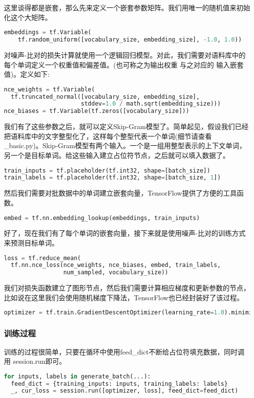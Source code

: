 这里谈得都是嵌套，那么先来定义一个嵌套参数矩阵。我们用唯一的随机值来初始化这个大矩阵。
\begin{lstlisting}[language=Python]
embeddings = tf.Variable(
    tf.random_uniform([vocabulary_size, embedding_size], -1.0, 1.0))
\end{lstlisting}
对噪声-比对的损失计算就使用一个逻辑回归模型。对此，我们需要对语料库中的每个单词定义一个权重值和偏差值。(也可称之为输出权重 与之对应的 输入嵌套值)。定义如下:
\begin{lstlisting}[language=Python]
nce_weights = tf.Variable(
  tf.truncated_normal([vocabulary_size, embedding_size],
                      stddev=1.0 / math.sqrt(embedding_size)))
nce_biases = tf.Variable(tf.zeros([vocabulary_size]))
\end{lstlisting}我们有了这些参数之后，就可以定义Skip-Gram模型了。简单起见，假设我们已经把语料库中的文字整型化了，这样每个整型代表一个单词(细节请查看\_basic.py)。Skip-Gram模型有两个输入。一个是一组用整型表示的上下文单词，另一个是目标单词。给这些输入建立占位符节点，之后就可以填入数据了。
\begin{lstlisting}[language=Python]
train_inputs = tf.placeholder(tf.int32, shape=[batch_size])
train_labels = tf.placeholder(tf.int32, shape=[batch_size, 1])
\end{lstlisting}
然后我们需要对批数据中的单词建立嵌套向量，TensorFlow提供了方便的工具函数。
\begin{lstlisting}[language=Python]
embed = tf.nn.embedding_lookup(embeddings, train_inputs)
\end{lstlisting}
好了，现在我们有了每个单词的嵌套向量，接下来就是使用噪声-比对的训练方式来预测目标单词。
\begin{lstlisting}[language=Python]
loss = tf.reduce_mean(
  tf.nn.nce_loss(nce_weights, nce_biases, embed, train_labels,
                 num_sampled, vocabulary_size))
\end{lstlisting}
我们对损失函数建立了图形节点，然后我们需要计算相应梯度和更新参数的节点，比如说在这里我们会使用随机梯度下降法，TensorFlow也已经封装好了该过程。
\begin{lstlisting}[language=Python]
optimizer = tf.train.GradientDescentOptimizer(learning_rate=1.0).minimize(loss)
\end{lstlisting}
\subsubsection{训练过程}
训练的过程很简单，只要在循环中使用feed\_dict不断给占位符填充数据，同时调用 session.run即可。
\begin{lstlisting}[language=Python]
for inputs, labels in generate_batch(...):
  feed_dict = {training_inputs: inputs, training_labels: labels}
  _, cur_loss = session.run([optimizer, loss], feed_dict=feed_dict)
\end{lstlisting}
